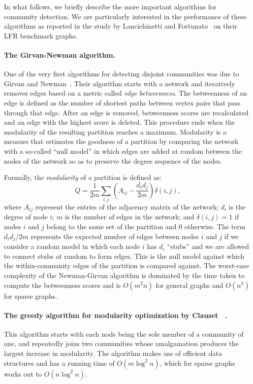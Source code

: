 In what follows, we briefly describe the more important algorithms 
for community detection. We are particularly interested in the performance 
of these algorithms as reported in the study by Lancichinetti and 
Fortunato~\cite{LF09} on their LFR benchmark graphs. 

\paragraph{The Girvan-Newman algorithm.} 
One of the very first algorithms for detecting disjoint communities 
was due to Girvan and Newman~\cite{GN02, GN04}. Their 
algorithm starts with a network and iteratively removes edges based 
on a metric called \emph{edge betweenness}. The betweenness of an 
edge is defined as the number of shortest paths between vertex pairs 
that pass through that edge. After an edge is removed, betweenness 
scores are recalculated and an edge with the highest score is deleted. 
This procedure ends when the modularity of the resulting partition
reaches a maximum. Modularity is a measure that estimates the goodness 
of a partition by comparing the network with a so-called ``null model''
in which edges are added at random between the nodes of the network 
so as to preserve the degree sequence of the nodes. 

Formally, the \emph{modularity} of a partition is defined as:
\begin{equation}\label{eqn:modularity}
	Q = \frac{1}{2m} \sum_{i, j} \left ( A_{i j} - \frac{d_i d_j}{2m} \right ) \delta(i, j),
\end{equation}
where $A_{ij}$ represent the entries of the adjacency matrix of the network; $d_i$ is the 
degree of node $i$; $m$ is the number of edges in the network; and $\delta(i, j) = 1$ if nodes
$i$ and $j$ belong to the same set of the partition and $0$ otherwise. The term $d_i d_j / 2m$ 
represents the expected number of edges between nodes $i$ and $j$ if we consider a random model
in which each node $i$ has $d_i$ ``stubs'' and we are allowed to connect stubs at random to form edges. 
This is the null model against which the within-community edges of the partition is compared against.
The worst-case complexity of the Newman-Girvan algorithm is dominated by the time taken 
to compute the betweenness scores and is $O(m^2 n)$ for general graphs and $O(n^3)$ for sparse graphs.

\paragraph{The greedy algorithm for modularity optimization by Clauset \etal~\cite{CNM04}.}
This algorithm starts with each node being the sole member of a community of one, and 
repeatedly joins two communities whose amalgamation produces the largest increase in modularity. 
The algorithm makes use of efficient data structures and has a running time of $O(m \log^2 n)$, 
which for sparse graphs works out to $O(n \log^2 n)$. 

